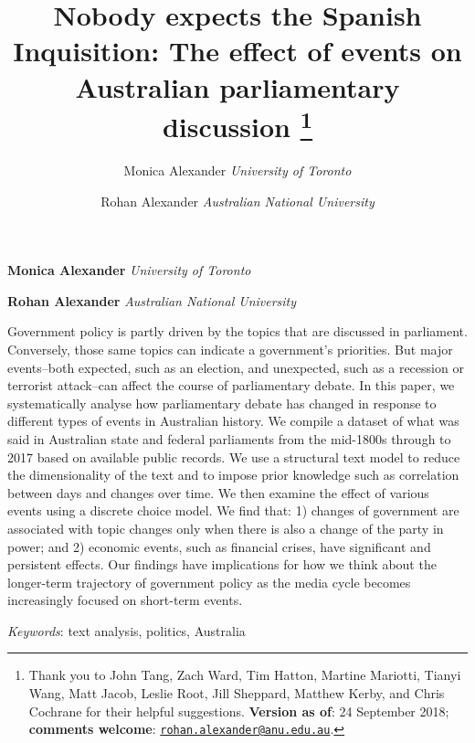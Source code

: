 \documentclass[12pt,]{article}
\title{Nobody expects the Spanish Inquisition: The effect of events on
Australian parliamentary discussion \thanks{Thank you to John Tang, Zach Ward, Tim Hatton, Martine Mariotti, Tianyi
Wang, Matt Jacob, Leslie Root, Jill Sheppard, Matthew Kerby, and Chris
Cochrane for their helpful suggestions. \textbf{Version as of}: 24
September 2018; \textbf{comments welcome}:
\href{mailto:rohan.alexander@anu.edu.au}{\nolinkurl{rohan.alexander@anu.edu.au}}.}  }
\author{\Large Monica Alexander\vspace{0.05in} \newline\normalsize\emph{University of Toronto}   \and \Large Rohan Alexander\vspace{0.05in} \newline\normalsize\emph{Australian National University}  }
\date{}
\newcommand*{\authorfont}{\fontfamily{phv}\selectfont}
\renewenvironment{abstract}
 {{%
    \setlength{\leftmargin}{0mm}
    \setlength{\rightmargin}{\leftmargin}%
  }%
  \relax}
 {\endlist}
\theoremstyle{definition}
\theoremstyle{definition}
\theoremstyle{definition}
\theoremstyle{remark}
\begin{document}
	
%

{%
\setlength{\parindent}{0pt}
\thispagestyle{plain}
{\fontsize{18}{20}\selectfont\raggedright 
\maketitle  %

}

{
   \vskip 13.5pt\relax \normalsize\fontsize{11}{12} 
\textbf{\authorfont Monica Alexander} \hskip 15pt \emph{\small University of Toronto}   \par \textbf{\authorfont Rohan Alexander} \hskip 15pt \emph{\small Australian National University}   

}

}








\begin{abstract}

    \hbox{\vrule height .2pt width 39.14pc}

    \vskip 8.5pt %

\noindent Government policy is partly driven by the topics that are discussed in
parliament. Conversely, those same topics can indicate a government's
priorities. But major events--both expected, such as an election, and
unexpected, such as a recession or terrorist attack--can affect the
course of parliamentary debate. In this paper, we systematically analyse
how parliamentary debate has changed in response to different types of
events in Australian history. We compile a dataset of what was said in
Australian state and federal parliaments from the mid-1800s through to
2017 based on available public records. We use a structural text model
to reduce the dimensionality of the text and to impose prior knowledge
such as correlation between days and changes over time. We then examine
the effect of various events using a discrete choice model. We find
that: 1) changes of government are associated with topic changes only
when there is also a change of the party in power; and 2) economic
events, such as financial crises, have significant and persistent
effects. Our findings have implications for how we think about the
longer-term trajectory of government policy as the media cycle becomes
increasingly focused on short-term events.


\vskip 8.5pt \noindent \emph{Keywords}: text analysis, politics, Australia \par

    \hbox{\vrule height .2pt width 39.14pc}



\end{abstract}
\end{document}
